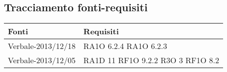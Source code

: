 \subsection{Tracciamento fonti-requisiti}
      \begin{center}
      \bgroup
      \def\arraystretch{1.8}
      \begin{longtable}{ | p{5cm} | p{5cm} |}
    
      \cellcolor[gray]{0.9} \textbf{Fonti} & \cellcolor[gray]{0.9} \textbf{Requisiti} \\ \hline       
            Verbale-2013/12/18 &  RA1O 6.2.4 \newline  RA1O 6.2.3 \newline  \\ \hline      
            Verbale-2013/12/05 &  RA1D 11 \newline  RF1O 9.2.2  \newline  R3O 3 \newline  RF1O 8.2  \newline  \\ \hline      

\end{longtable}
\end{center}
